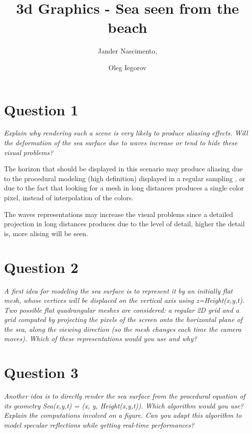 \documentclass{report}
\begin{document}
\title{3d Graphics - Sea seen from the beach}

\author{Jander Nascimento, 
\and Oleg Iegorov}

\maketitle

\section{Question 1}

\emph{Explain why rendering such a scene is very likely to produce aliasing effects. Will the
deformation of the sea surface due to waves increase or tend to hide these visual problems?}

The horizon that should be displayed in this scenario may produce aliasing due to the procedural modeling (high definition) displayed in a regular sampling \cite{iaow}, or due to the fact that looking for a mesh in long distances produces a single color pixel, instead of interpolation of the colors. 

The waves representations may increase the visual problems since a detailed projection in long distances produces due to the level of detail, higher the detail is, more alising will be seen.

\section{Question 2}

\emph{A first idea for modeling the sea surface is to represent it by an initially flat mesh, whose
vertices will be displaced on the vertical axis using z=Height(x,y,t). Two possible flat
quadrangular meshes are considered: a regular 2D grid and a grid computed by projecting the
pixels of the screen onto the horizontal plane of the sea, along the viewing direction (so the
mesh changes each time the camera moves). Which of these representations would you use
and why?}

\section{Question 3}

\emph{Another idea is to directly render the sea surface from the procedural equation of its
geometry Sea(x,y,t) = (x, y, Height(x,y,t)). Which algorithm would you use? Explain the
computations involved on a figure. Can you adapt this algorithm to model specular
reflections while getting real-time performances?}
\end{document}
